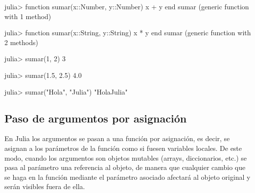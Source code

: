 \documentclass[
  letterpaper,
  DIV=11,
  numbers=noendperiod]{scrreprt}
\newenvironment{Shaded}{\begin{snugshade}}{\end{snugshade}}
\newcommand{\DataTypeTok}[1]{\textcolor[rgb]{0.68,0.00,0.00}{#1}}
\newcommand{\FloatTok}[1]{\textcolor[rgb]{0.68,0.00,0.00}{#1}}
\newcommand{\FunctionTok}[1]{\textcolor[rgb]{0.28,0.35,0.67}{#1}}
\newcommand{\KeywordTok}[1]{\textcolor[rgb]{0.00,0.23,0.31}{#1}}
\newcommand{\NormalTok}[1]{\textcolor[rgb]{0.00,0.23,0.31}{#1}}
\newcommand{\OperatorTok}[1]{\textcolor[rgb]{0.37,0.37,0.37}{#1}}
\newcommand{\StringTok}[1]{\textcolor[rgb]{0.13,0.47,0.30}{#1}}
\begin{document}
\begin{Shaded}
\begin{Highlighting}[]
\NormalTok{julia}\OperatorTok{\textgreater{}} \KeywordTok{function} \FunctionTok{sumar}\NormalTok{(x}\OperatorTok{::}\DataTypeTok{Number}\NormalTok{, y}\OperatorTok{::}\DataTypeTok{Number}\NormalTok{)}
\NormalTok{       x }\OperatorTok{+}\NormalTok{ y}
       \KeywordTok{end}
\NormalTok{sumar (generic }\KeywordTok{function}\NormalTok{ with }\FloatTok{1}\NormalTok{ method)}

\NormalTok{julia}\OperatorTok{\textgreater{}} \KeywordTok{function} \FunctionTok{sumar}\NormalTok{(x}\OperatorTok{::}\DataTypeTok{String}\NormalTok{, y}\OperatorTok{::}\DataTypeTok{String}\NormalTok{)}
\NormalTok{       x }\OperatorTok{*}\NormalTok{ y}
       \KeywordTok{end}
\NormalTok{sumar (generic }\KeywordTok{function}\NormalTok{ with }\FloatTok{2}\NormalTok{ methods)}

\NormalTok{julia}\OperatorTok{\textgreater{}} \FunctionTok{sumar}\NormalTok{(}\FloatTok{1}\NormalTok{, }\FloatTok{2}\NormalTok{)}
\FloatTok{3}

\NormalTok{julia}\OperatorTok{\textgreater{}} \FunctionTok{sumar}\NormalTok{(}\FloatTok{1.5}\NormalTok{, }\FloatTok{2.5}\NormalTok{)}
\FloatTok{4.0}

\NormalTok{julia}\OperatorTok{\textgreater{}} \FunctionTok{sumar}\NormalTok{(}\StringTok{"Hola"}\NormalTok{, }\StringTok{"Julia"}\NormalTok{)}
\StringTok{"HolaJulia"}
\end{Highlighting}
\end{Shaded}

\hypertarget{paso-de-argumentos-por-asignaciuxf3n}{%
\subsection{Paso de argumentos por
asignación}\label{paso-de-argumentos-por-asignaciuxf3n}}

En Julia los argumentos se pasan a una función por asignación, es decir,
se asignan a los parámetros de la función como si fuesen variables
locales. De este modo, cuando los argumentos son objetos mutables
(arrays, diccionarios, etc.) se pasa al parámetro una referencia al
objeto, de manera que cualquier cambio que se haga en la función
mediante el parámetro asociado afectará al objeto original y serán
visibles fuera de ella.
\end{document}

